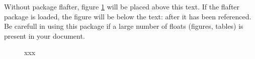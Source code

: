 \documentclass[12pt]{article}
\newcommand\fakepic[2]{\framebox[#1cm]{\rule{0pt}{#2cm}\small #1$\times$#2 cm$^2$}}
\begin{document}
Without package flafter, figure \ref{fig:1} will be placed above this text.
If the flafter package is loaded, the figure will be below the text: 
after it has been referenced. Be carefull in using this package if a 
large number of floats (figures, tables) is present in your document. 



\begin{figure}
\centering
\fakepic{5}{1}
\caption{xxx}\label{fig:1}
\end{figure}
\end{document}
